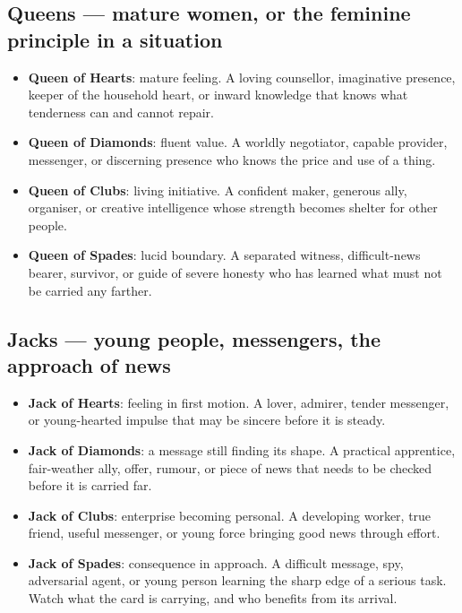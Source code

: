 \subsection{Queens --- mature women, or the feminine principle in a situation}\label{queens--mature-women-or-the-feminine-principle-in-a-situation}

\begin{itemize}
\tightlist
\item
  \textbf{Queen of Hearts}: mature feeling. A loving counsellor, imaginative
  presence, keeper of the household heart, or inward knowledge that knows what
  tenderness can and cannot repair.
\item
  \textbf{Queen of Diamonds}: fluent value. A worldly negotiator, capable
  provider, messenger, or discerning presence who knows the price and use of a
  thing.
\item
  \textbf{Queen of Clubs}: living initiative. A confident maker, generous ally,
  organiser, or creative intelligence whose strength becomes shelter for other
  people.
\item
  \textbf{Queen of Spades}: lucid boundary. A separated witness, difficult-news
  bearer, survivor, or guide of severe honesty who has learned what must not be
  carried any farther.
\end{itemize}

\subsection{Jacks --- young people, messengers, the approach of news}\label{jacks--young-people-messengers-the-approach-of-news}

\begin{itemize}
\tightlist
\item
  \textbf{Jack of Hearts}: feeling in first motion. A lover, admirer, tender
  messenger, or young-hearted impulse that may be sincere before it is steady.
\item
  \textbf{Jack of Diamonds}: a message still finding its shape. A practical
  apprentice, fair-weather ally, offer, rumour, or piece of news that needs to be
  checked before it is carried far.
\item
  \textbf{Jack of Clubs}: enterprise becoming personal. A developing worker,
  true friend, useful messenger, or young force bringing good news through
  effort.
\item
  \textbf{Jack of Spades}: consequence in approach. A difficult message, spy,
  adversarial agent, or young person learning the sharp edge of a serious task.
  Watch what the card is carrying, and who benefits from its arrival.
\end{itemize}

